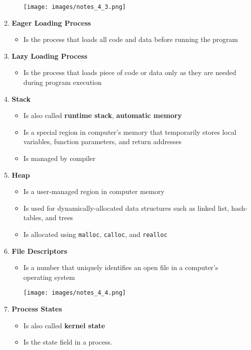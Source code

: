 \documentclass[12pt]{article}
\begin{document}
\begin{mdframed}
\begin{enumerate}[1.]
\begin{itemize}
        \begin{center}
        \texttt{[image: images/notes\_4\_3.png]}
        \end{center}
    \end{itemize}
    \item \textbf{Eager Loading Process}
    \begin{itemize}
        \item Is the process that loads all code and data before running the program
    \end{itemize}
    \item \textbf{Lazy Loading Process}
    \begin{itemize}
        \item Is the process that loads piece of code or data only as they are needed during
        program execution
    \end{itemize}
    \item \textbf{Stack}
    \begin{itemize}
        \item Is also called \textbf{runtime stack}, \textbf{automatic memory}
        \item Is a special region in computer's memory that temporarily stores local variables,
        function parameters, and return addresses
        \item Is managed by compiler
    \end{itemize}
    \item \textbf{Heap}
    \begin{itemize}
        \item Is a user-managed region in computer memory
        \item Is used for dynamically-allocated data structures such as linked list, hash-tables, and trees
        \item Is allocated using \texttt{malloc}, \texttt{calloc}, and \texttt{realloc}
    \end{itemize}
    \item \textbf{File Descriptors}
    \begin{itemize}
        \item Is a number that uniquely identifies an open file in a computer's operating system

        \begin{center}
        \texttt{[image: images/notes\_4\_4.png]}
        \end{center}
    \end{itemize}
    \item \textbf{Process States}
    \begin{itemize}
        \item Is also called \textbf{kernel state}
        \item Is the state field in a process.


\end{itemize}
\end{enumerate}
\end{mdframed}
\end{document}
